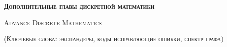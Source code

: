 


\thispagestyle{empty}


\centerline{\large \textsc{\textbf{Дополнительные главы дискретной математики}}}
\centerline{\textsc{Advance Discrete Mathematics}}
\centerline{\small \textsc{(Ключевые слова: экспандеры, коды исправляющие ошибки, спектр графа)}}

\bigskip



\vspace{1cm}

%    

\nocite{*}
%
%
\printbibliography




